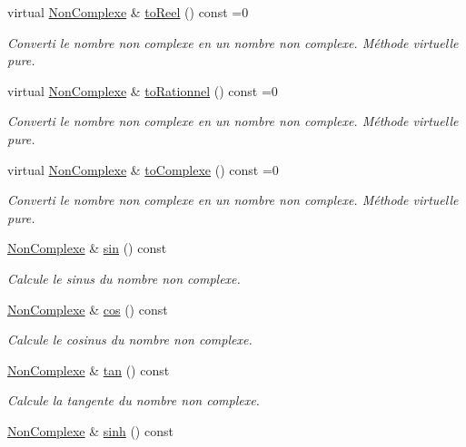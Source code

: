 \begin{DoxyCompactItemize}
virtual \hyperlink{classNonComplexe}{\-Non\-Complexe} \& \hyperlink{classNonComplexe_a0bd70b66aeb18213beb9d777287540de}{to\-Reel} () const =0
\begin{DoxyCompactList}\small\item\em \-Converti le nombre non complexe en un nombre non complexe. \-Méthode virtuelle pure. \end{DoxyCompactList}\item 
virtual \hyperlink{classNonComplexe}{\-Non\-Complexe} \& \hyperlink{classNonComplexe_a5c416e7c9d4c011c67b69b112cc30cc1}{to\-Rationnel} () const =0
\begin{DoxyCompactList}\small\item\em \-Converti le nombre non complexe en un nombre non complexe. \-Méthode virtuelle pure. \end{DoxyCompactList}\item 
virtual \hyperlink{classNonComplexe}{\-Non\-Complexe} \& \hyperlink{classNonComplexe_ad29a8407072d909cd204945d5cd5bc17}{to\-Complexe} () const =0
\begin{DoxyCompactList}\small\item\em \-Converti le nombre non complexe en un nombre non complexe. \-Méthode virtuelle pure. \end{DoxyCompactList}\item 
\hyperlink{classNonComplexe}{\-Non\-Complexe} \& \hyperlink{classNonComplexe_abf88a21ec1084e4a38cb2b5395baab6c}{sin} () const 
\begin{DoxyCompactList}\small\item\em \-Calcule le sinus du nombre non complexe. \end{DoxyCompactList}\item 
\hyperlink{classNonComplexe}{\-Non\-Complexe} \& \hyperlink{classNonComplexe_a48b17af73b9f5394bb59d092dddc84e0}{cos} () const 
\begin{DoxyCompactList}\small\item\em \-Calcule le cosinus du nombre non complexe. \end{DoxyCompactList}\item 
\hyperlink{classNonComplexe}{\-Non\-Complexe} \& \hyperlink{classNonComplexe_a76dce5128e2121dfbcda9c75d12279b2}{tan} () const 
\begin{DoxyCompactList}\small\item\em \-Calcule la tangente du nombre non complexe. \end{DoxyCompactList}\item 
\hyperlink{classNonComplexe}{\-Non\-Complexe} \& \hyperlink{classNonComplexe_aefb53599f4ea91e92f76fa66a879fe89}{sinh} () const 

\end{DoxyCompactItemize}
